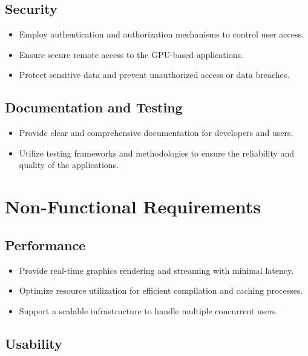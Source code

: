 \subsection{Security}

\begin{itemize}
    \item Employ authentication and authorization mechanisms to control user access.
    \item Ensure secure remote access to the GPU-based applications.
    \item Protect sensitive data and prevent unauthorized access or data breaches.
\end{itemize}


\subsection{Documentation and Testing}

\begin{itemize}
    \item Provide clear and comprehensive documentation for developers and users.
    \item Utilize testing frameworks and methodologies to ensure the reliability and quality of the applications.
\end{itemize}


\section{Non-Functional Requirements}


\subsection{Performance}

\begin{itemize}
    \item Provide real-time graphics rendering and streaming with minimal latency.
    \item Optimize resource utilization for efficient compilation and caching processes.
    \item Support a scalable infrastructure to handle multiple concurrent users.
\end{itemize}


\subsection{Usability}

